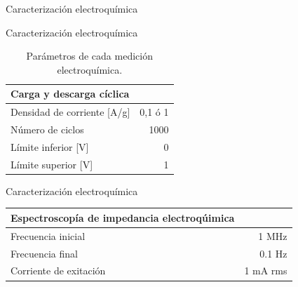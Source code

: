 \documentclass[aspectratio=169]{beamer}
\begin{document}
	\begin{frame}[fragile]{Caracterización electroquímica}
		\begin{figure}
		\end{figure}
	\end{frame}

	\begin{frame}{Caracterización electroquímica}
\begin{table}[h!]
	\centering
	\begin{tabular}{ l r }
		Carga y descarga cíclica & \\
		\hline
		Densidad de corriente [A/g] & 0,1 ó 	1 \\
		Número de ciclos & 1000 \\
		Límite inferior [V] & 0 \\
		Límite superior [V] & 1 \\
	\end{tabular}
	\label{tab:elec_config}
	\caption[Parámetros de cada medición electroquímica]{Parámetros de cada medición electroquímica.}
\end{table}
\end{frame}

	\begin{frame}{Caracterización electroquímica}
\begin{table}[h!]
	\centering
	\begin{tabular}{ l r }
		Espectroscopía de impedancia electroqúimica & \\
		\hline
		Frecuencia inicial	&	1 MHz \\
		Frecuencia final	&	0.1 Hz \\
		Corriente de exitación & 1 mA rms \\ 
	\end{tabular}
\end{table}
\end{frame}
\end{document}

